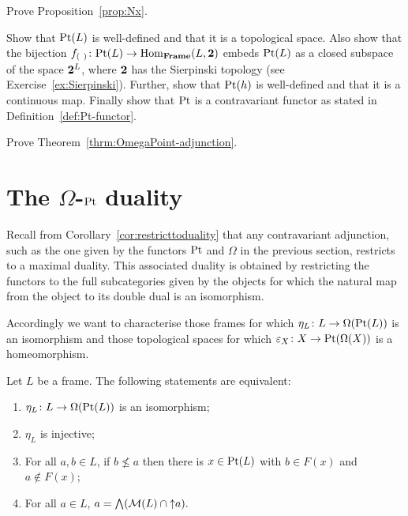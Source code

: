 \begin{exercise}
  \label{exer:proveNx}
Prove Proposition~\ref{prop:Nx}.
\end{exercise}

\begin{exercise}\label{exer:pt-functor}
Show that $\mathrm{Pt}(L)$ is well-defined and that it is a topological space. Also show that the bijection $f_{(\ )}\colon\mathrm{Pt}(L)\to\mathrm{Hom}_{\mathbf{Frame}}(L,{\bf 2})$ embeds $\mathrm{Pt}(L)$ as a closed subspace of the space ${\bf 2}^L$, where ${\bf 2}$ has the Sierpinski topology (see Exercise~\ref{ex:Sierpinski}). Further, show that $\mathrm{Pt}(h)$ is well-defined and that it is a continuous map. Finally show that $\mathrm{Pt}$ is a contravariant functor as stated in Definition~\ref{def:Pt-functor}.
\end{exercise}

\begin{exercise}
Prove Theorem~\ref{thrm:OmegaPoint-adjunction}.
\end{exercise}




\section{The \texorpdfstring{$\Omega$}{Omega}-\texorpdfstring{$\mathrm{Pt}$}{Pt} duality}\label{sec:Omega-Pt-duality}
Recall from Corollary~\ref{cor:restricttoduality} that any contravariant adjunction, such as the one given by the functors $\mathrm{Pt}$ and $\Omega$ in the previous section, restricts to a maximal duality. This associated duality is obtained by restricting the functors to the full subcategories given by the objects for which the natural map from the object to its double dual is an isomorphism. 

Accordingly we want to characterise those frames for which $\eta_L\colon L\to\Omega(\mathrm{Pt}(L))$ is an isomorphism and those topological spaces for which $\varepsilon_X\colon X\to\mathrm{Pt}(\Omega(X))$ is a homeomorphism.

\begin{proposition}\label{prop:spatial}
Let $L$ be a frame. The following statements are equivalent:
\begin{enumerate}[label=(\roman*)]
\item $\eta_L\colon L\to\Omega(\mathrm{Pt}(L))$ is an isomorphism;
\item $\eta_L$ is injective;
\item For all $a,b\in L$, if $b\nleq a$ then there is $x\in\mathrm{Pt}(L)$ with $b\in F(x)$ and $a\not\in F(x)$;
\item For all $a\in L$, \quad $a=\bigwedge(\mathcal{M}(L)\cap{\uparrow} a).$
\end{enumerate}
\end{proposition}

